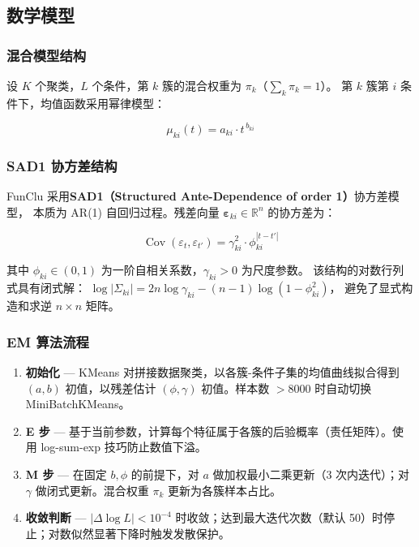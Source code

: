 \documentclass[12pt,a4paper]{ctexart}
\begin{document}
\subsection{数学模型}

\subsubsection{混合模型结构}

设 $K$ 个聚类，$L$ 个条件，第 $k$ 簇的混合权重为 $\pi_k$（$\sum_k \pi_k = 1$）。
第 $k$ 簇第 $i$ 条件下，均值函数采用幂律模型：

\[
\mu_{ki}(t) = a_{ki} \cdot t^{\,b_{ki}}
\]

\subsubsection{SAD1 协方差结构}

FunClu 采用\textbf{SAD1（Structured Ante-Dependence of order 1）}协方差模型，
本质为 AR(1) 自回归过程。残差向量 $\boldsymbol{\varepsilon}_{ki} \in \mathbb{R}^n$ 的协方差为：

\[
\operatorname{Cov}(\varepsilon_t, \varepsilon_{t'}) = \gamma_{ki}^2 \cdot \phi_{ki}^{|t-t'|}
\]

其中 $\phi_{ki} \in (0, 1)$ 为一阶自相关系数，$\gamma_{ki} > 0$ 为尺度参数。
该结构的对数行列式具有闭式解：
$\log|\Sigma_{ki}| = 2n \log \gamma_{ki} - (n-1) \log(1 - \phi_{ki}^2)$，
避免了显式构造和求逆 $n \times n$ 矩阵。

\subsubsection{EM 算法流程}

\begin{enumerate}[leftmargin=*]
    \item \textbf{初始化} --- KMeans 对拼接数据聚类，以各簇-条件子集的均值曲线拟合得到 $(a, b)$ 初值，以残差估计 $(\phi, \gamma)$ 初值。样本数 $> 8000$ 时自动切换 MiniBatchKMeans。
    \item \textbf{E 步} --- 基于当前参数，计算每个特征属于各簇的后验概率（责任矩阵）。使用 log-sum-exp 技巧防止数值下溢。
    \item \textbf{M 步} --- 在固定 $b, \phi$ 的前提下，对 $a$ 做加权最小二乘更新（3 次内迭代）；对 $\gamma$ 做闭式更新。混合权重 $\pi_k$ 更新为各簇样本占比。
    \item \textbf{收敛判断} --- $|\Delta \log L| < 10^{-4}$ 时收敛；达到最大迭代次数（默认 50）时停止；对数似然显著下降时触发发散保护。
\end{enumerate}
\end{document}

